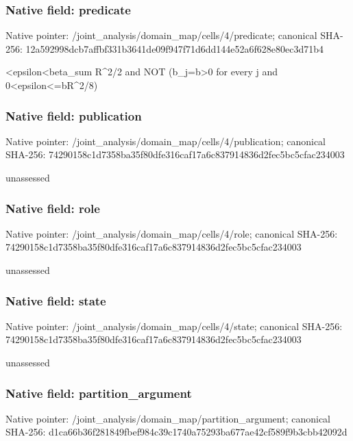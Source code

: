 \documentclass[10pt,a4paper]{article}
\begin{document}
\subsubsection{Native field: predicate}
Native pointer: /joint\_\allowbreak{}analysis/domain\_\allowbreak{}map/cells/4/predicate; canonical SHA-256: 12a592998dcb7affbf331b3641de09f947f71d6dd144e52a6f628e80ec3d71b4

\begingroup\raggedright{}<epsilon<beta\_\allowbreak{}sum R\textasciicircum{}2/\allowbreak{}2 and NOT (b\_\allowbreak{}j=\allowbreak{}b>0 for every j and 0<epsilon<=\allowbreak{}bR\textasciicircum{}2/\allowbreak{}8)\par\endgroup

\subsubsection{Native field: publication}
Native pointer: /joint\_\allowbreak{}analysis/domain\_\allowbreak{}map/cells/4/publication; canonical SHA-256: 74290158c1d7358ba35f80dfe316caf17a6c837914836d2fec5bc5cfac234003

\begingroup\raggedright\sloppy unassessed\par\endgroup

\subsubsection{Native field: role}
Native pointer: /joint\_\allowbreak{}analysis/domain\_\allowbreak{}map/cells/4/role; canonical SHA-256: 74290158c1d7358ba35f80dfe316caf17a6c837914836d2fec5bc5cfac234003

\begingroup\raggedright\sloppy unassessed\par\endgroup

\subsubsection{Native field: state}
Native pointer: /joint\_\allowbreak{}analysis/domain\_\allowbreak{}map/cells/4/state; canonical SHA-256: 74290158c1d7358ba35f80dfe316caf17a6c837914836d2fec5bc5cfac234003

\begingroup\raggedright\sloppy unassessed\par\endgroup

\subsubsection{Native field: partition\_\allowbreak{}argument}
Native pointer: /joint\_\allowbreak{}analysis/domain\_\allowbreak{}map/partition\_\allowbreak{}argument; canonical SHA-256: d1ca66b36f281849fbef984c39c1740a75293ba677ae42cf589f9b3cbb42092d
\end{document}
